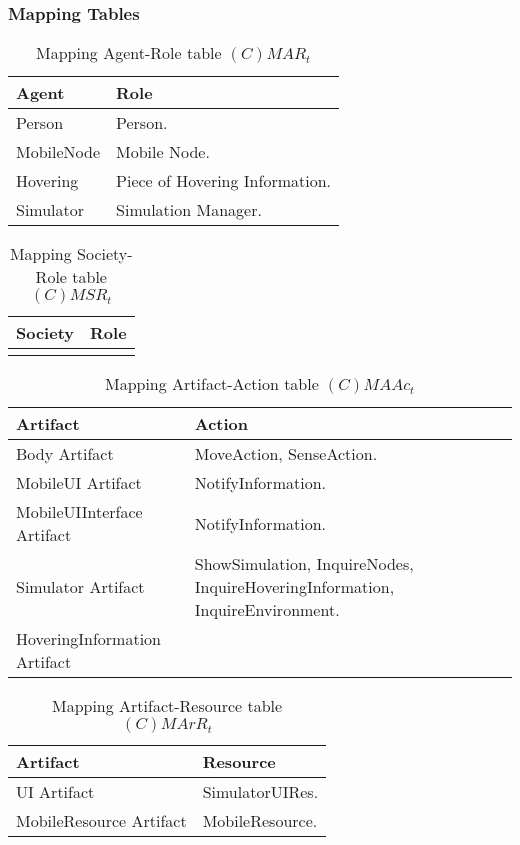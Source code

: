 \subsubsection{Mapping Tables}

\begin{table}[H]
	\centering
	\begin{tabular}{|p{4cm}|p{8cm}|}
			\hline
			\textbf{Agent} & \textbf{Role} \\
			\hline
			Person & Person. \\
			\hline
			MobileNode & Mobile Node.  \\
			\hline
			Hovering & Piece of Hovering Information. \\
			\hline
			Simulator & Simulation Manager. \\
			\hline
		\end{tabular}
	\caption{Mapping Agent-Role table $(C)MAR_t$}
	\label{tab:cmart}
\end{table}

\begin{table}[H]
	\centering
	\begin{tabular}{|p{4cm}|p{8cm}|}
			\hline
			\textbf{Society} & \textbf{Role} \\
			\hline
			& \\
			\hline
		\end{tabular}
	\caption{Mapping Society-Role table $(C)MSR_t$}
	\label{tab:cmsrt}
\end{table}

\begin{table}[H]
	\centering
	\begin{tabular}{|p{4cm}|p{8cm}|}
			\hline
			\textbf{Artifact} & \textbf{Action} \\
			\hline
			Body Artifact & MoveAction, SenseAction. \\
			\hline
			MobileUI Artifact & NotifyInformation. \\
			\hline
			MobileUIInterface Artifact & NotifyInformation. \\
			\hline
      Simulator Artifact & ShowSimulation, InquireNodes,
      InquireHoveringInformation, InquireEnvironment. \\
			\hline
			HoveringInformation Artifact & \\
			\hline
		\end{tabular}
	\caption{Mapping Artifact-Action table $(C)MAAc_t$}
	\label{tab:cmaact}
\end{table}

\begin{table}[H]
	\centering
	\begin{tabular}{|p{4cm}|p{8cm}|}
			\hline
			\textbf{Artifact} & \textbf{Resource} \\
			\hline
			UI Artifact & SimulatorUIRes. \\
			\hline
			MobileResource Artifact & MobileResource. \\
			\hline
		\end{tabular}
	\caption{Mapping Artifact-Resource table $(C)MArR_t$}
	\label{tab:cmarrt}
\end{table}

